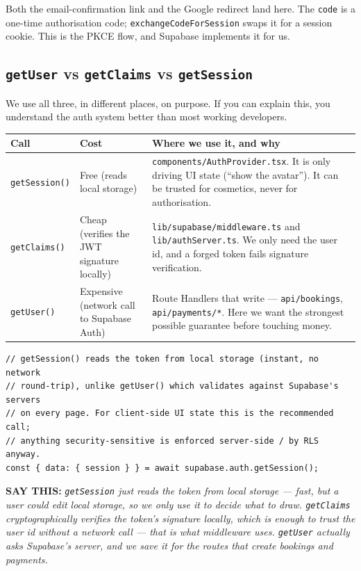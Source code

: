 \documentclass[11pt,a4paper]{article}
\newcommand{\saythis}[1]{\begin{saybox}\textbf{\small\color{primary}SAY THIS:} \textit{#1}\end{saybox}}
\newcommand{\file}[1]{\texttt{\small #1}}
\begin{document}
Both the email-confirmation link and the Google redirect land here. The
\texttt{code} is a one-time authorisation code; \texttt{exchangeCodeForSession}
swaps it for a session cookie. This is the PKCE flow, and Supabase implements it
for us.

\subsection{\texttt{getUser} vs \texttt{getClaims} vs \texttt{getSession}}

We use all three, in different places, on purpose. If you can explain this, you
understand the auth system better than most working developers.

\begin{longtable}{@{}p{2.6cm}p{4.4cm}p{7.8cm}@{}}
\toprule
\textbf{Call} & \textbf{Cost} & \textbf{Where we use it, and why} \\
\midrule
\endhead
\texttt{getSession()} & Free (reads local storage) & \file{components/AuthProvider.tsx}.
It is only driving UI state (``show the avatar''). It can be trusted for
cosmetics, never for authorisation. \\
\addlinespace
\texttt{getClaims()} & Cheap (verifies the JWT signature locally) &
\file{lib/supabase/middleware.ts} and \file{lib/authServer.ts}. We only need the
user id, and a forged token fails signature verification. \\
\addlinespace
\texttt{getUser()} & Expensive (network call to Supabase Auth) &
Route Handlers that write --- \file{api/bookings}, \file{api/payments/*}. Here we
want the strongest possible guarantee before touching money. \\
\bottomrule
\end{longtable}

\begin{lstlisting}[language=TS,caption={components/AuthProvider.tsx --- the comment explains the trade-off}]
// getSession() reads the token from local storage (instant, no network
// round-trip), unlike getUser() which validates against Supabase's servers
// on every page. For client-side UI state this is the recommended call;
// anything security-sensitive is enforced server-side / by RLS anyway.
const { data: { session } } = await supabase.auth.getSession();
\end{lstlisting}

\saythis{\texttt{getSession} just reads the token from local storage --- fast, but a
user could edit local storage, so we only use it to decide what to \emph{draw}.
\texttt{getClaims} cryptographically verifies the token's signature locally, which
is enough to trust the user id without a network call --- that is what middleware
uses. \texttt{getUser} actually asks Supabase's server, and we save it for the
routes that create bookings and payments.}
\end{document}
